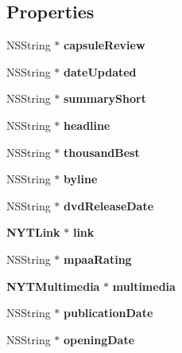 \subsection*{Properties}
\begin{DoxyCompactItemize}
\item 
N\+S\+String $\ast$ {\bfseries capsule\+Review}\label{interface_n_y_t_results_a966f92ce22978564c5a819f26bc01bf3}

\item 
N\+S\+String $\ast$ {\bfseries date\+Updated}\label{interface_n_y_t_results_a09f0091c3f82f05f1017f13b9e602935}

\item 
N\+S\+String $\ast$ {\bfseries summary\+Short}\label{interface_n_y_t_results_acf37ee32a945ef96e51ecbd07ed5f441}

\item 
N\+S\+String $\ast$ {\bfseries headline}\label{interface_n_y_t_results_ae077c8e539187a0ec56599ddbd3e1222}

\item 
N\+S\+String $\ast$ {\bfseries thousand\+Best}\label{interface_n_y_t_results_abcba0099f11b3fd5e990275e8e39bef2}

\item 
N\+S\+String $\ast$ {\bfseries byline}\label{interface_n_y_t_results_a5da8bbd80a61559400c339a1bba60356}

\item 
N\+S\+String $\ast$ {\bfseries dvd\+Release\+Date}\label{interface_n_y_t_results_ab1af367e198accef17f61d80d330c365}

\item 
{\bf N\+Y\+T\+Link} $\ast$ {\bfseries link}\label{interface_n_y_t_results_a694f12c1dd6d4179c5085d4b015bbc1e}

\item 
N\+S\+String $\ast$ {\bfseries mpaa\+Rating}\label{interface_n_y_t_results_a4921a11960457036440b01e6db9ff332}

\item 
{\bf N\+Y\+T\+Multimedia} $\ast$ {\bfseries multimedia}\label{interface_n_y_t_results_a8342c67b54cdae9da6996bf5cff43e7b}

\item 
N\+S\+String $\ast$ {\bfseries publication\+Date}\label{interface_n_y_t_results_ac7e354381bcc9ca878f4ff7a78eb57c3}

\item 
N\+S\+String $\ast$ {\bfseries opening\+Date}\label{interface_n_y_t_results_adda6298e78c63a87060b337a4b802b65}


\end{DoxyCompactItemize}
